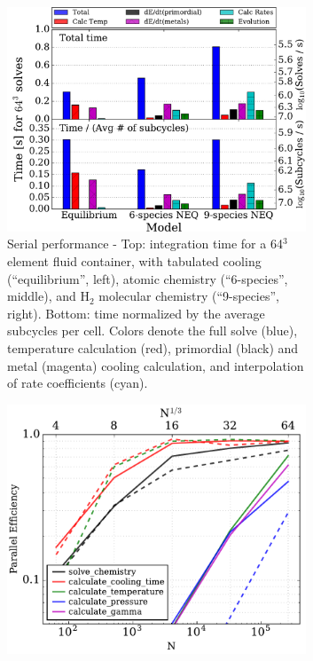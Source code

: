 \begin{figure}[h]
\centering
\begin{subfigure}{.54\textwidth}
  \centering
  \includegraphics[width=0.98\textwidth]{figures/performance.pdf}
  \caption{Serial performance - Top: integration time for a 64$^{3}$
    element fluid container, with tabulated cooling (``equilibrium'',
    left), atomic chemistry (``6-species'', middle), and H$_{2}$ molecular chemistry
    (``9-species'', right).  Bottom: time normalized by the
    average subcycles per cell.  Colors denote the full solve
    (blue), temperature calculation (red), primordial (black) and metal
    (magenta) cooling calculation, and interpolation of rate
    coefficients (cyan).}
  \label{fig:single-proc}
\end{subfigure}%
\hspace{0.02\textwidth}
\begin{subfigure}{.42\textwidth}
  \centering
  \includegraphics[width=0.98\textwidth]{figures/openmp.pdf}

\end{subfigure}
\end{figure}

